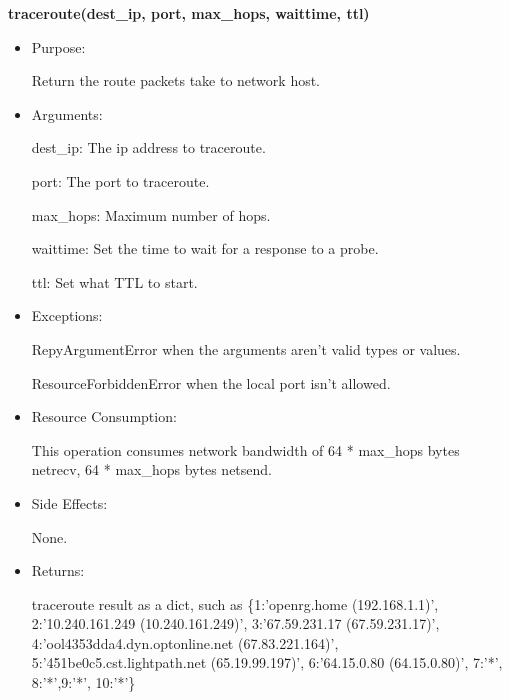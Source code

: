\textbf{traceroute(dest\_ip, port, max\_hops, waittime, ttl)}
\begin{itemize}
\item Purpose:

Return the route packets take to network host.

\item Arguments:

dest\_ip: The ip address to traceroute.

port: The port to traceroute.

max\_hops: Maximum number of hops.

waittime: Set the time to wait for a response to a probe.

ttl: Set what TTL to start.

\item Exceptions:

RepyArgumentError when the arguments aren't valid types or values.


ResourceForbiddenError when the local port isn't allowed.

\item Resource Consumption:

This operation consumes network bandwidth of 64 * max\_hops bytes netrecv, 64 * max\_hops bytes netsend.

\item Side Effects:

None.

\item Returns:

traceroute result as a dict, such as \{1:'openrg.home (192.168.1.1)', 2:'10.240.161.249 (10.240.161.249)', 3:'67.59.231.17 (67.59.231.17)', 4:'ool4353dda4.dyn.optonline.net (67.83.221.164)', 5:'451be0c5.cst.lightpath.net (65.19.99.197)', 6:'64.15.0.80 (64.15.0.80)', 7:'*', 8:'*',9:'*', 10:'*'\}
\end{itemize}

